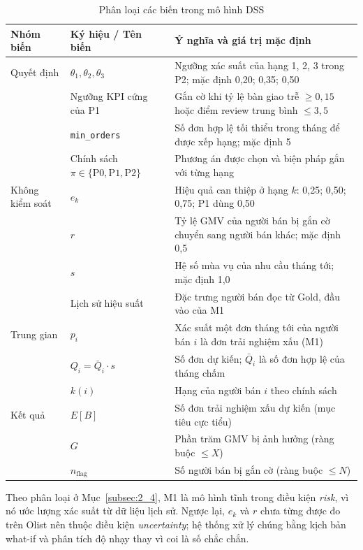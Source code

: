 \documentclass[a4paper]{article}
\begin{document}
\begin{table}[htbp]
\centering
\footnotesize
\setlength{\tabcolsep}{3pt}
\renewcommand{\arraystretch}{1.1}
\caption{Phân loại các biến trong mô hình DSS}
\label{tab:dss_variables}
\begin{tabularx}{\textwidth}{@{}>{\raggedright\arraybackslash}p{2.3cm}>{\raggedright\arraybackslash}p{5.0cm}>{\raggedright\arraybackslash}X@{}}
\toprule
\textbf{Nhóm biến} & \textbf{Ký hiệu / Tên biến} & \textbf{Ý nghĩa và giá trị mặc định} \\
\midrule
Quyết định & $\theta_1, \theta_2, \theta_3$ & Ngưỡng xác suất của hạng 1, 2, 3 trong P2; mặc định 0,20; 0,35; 0,50 \\
 & Ngưỡng KPI cứng của P1 & Gắn cờ khi tỷ lệ bàn giao trễ $\ge 0{,}15$ hoặc điểm review trung bình $\le 3{,}5$ \\
 & \texttt{min\_orders} & Số đơn hợp lệ tối thiểu trong tháng để được xếp hạng; mặc định 5 \\
 & Chính sách $\pi \in \{\text{P0}, \text{P1}, \text{P2}\}$ & Phương án được chọn và biện pháp gắn với từng hạng \\
\addlinespace
Không kiểm soát & $e_k$ & Hiệu quả can thiệp ở hạng $k$: 0,25; 0,50; 0,75; P1 dùng 0,50 \\
 & $r$ & Tỷ lệ GMV của người bán bị gắn cờ chuyển sang người bán khác; mặc định 0,5 \\
 & $s$ & Hệ số mùa vụ của nhu cầu tháng tới; mặc định 1,0 \\
 & Lịch sử hiệu suất & Đặc trưng người bán đọc từ Gold, đầu vào của M1 \\
\addlinespace
Trung gian & $p_i$ & Xác suất một đơn tháng tới của người bán $i$ là đơn trải nghiệm xấu (M1) \\
 & $Q_i = \bar{Q}_i \cdot s$ & Số đơn dự kiến; $\bar{Q}_i$ là số đơn hợp lệ của tháng chấm \\
 & $k(i)$ & Hạng của người bán $i$ theo chính sách \\
\addlinespace
Kết quả & $E[B]$ & Số đơn trải nghiệm xấu dự kiến (mục tiêu cực tiểu) \\
 & $G$ & Phần trăm GMV bị ảnh hưởng (ràng buộc $\le X$) \\
 & $n_{\text{flag}}$ & Số người bán bị gắn cờ (ràng buộc $\le N$) \\
\bottomrule
\end{tabularx}
\end{table}

Theo phân loại ở Mục~\ref{subsec:2_4}, M1 là mô hình tĩnh trong điều kiện \textit{risk}, vì nó ước lượng xác suất từ dữ liệu lịch sử. Ngược lại, $e_k$ và $r$ chưa từng được đo trên Olist nên thuộc điều kiện \textit{uncertainty}; hệ thống xử lý chúng bằng kịch bản what-if và phân tích độ nhạy thay vì coi là số chắc chắn.
\end{document}
